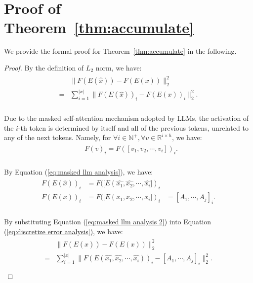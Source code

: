 \section{Proof of Theorem~\ref{thm:accumulate}}
\label{appendix:error_accumulate}
We provide the formal proof for Theorem~\ref{thm:accumulate} in the following. 
\begin{proof}
By the definition of $L_2$ norm, we have:\\
\begin{align}
\label{eq:discretize error analysis}
\begin{aligned}
    &  \| F(E(\hat{x}))-F(E(x)) \|_2^2 \\
    =& \sum_{i=1}^{|x|} \| F(E(\hat{x}))_i-F(E(x))_i \|_2^2.\\
\end{aligned}
\end{align}

Due to the masked self-attention mechanism adopted by LLMs, the activation of the $i$-th token is determined by itself and all of the previous tokens, unrelated to any of the next tokens. Namely, for $\forall i\in \mathbb{N}^+ ,\forall v \in \mathbb{R}^{i\times h}$, we have:\\
\begin{align}
\label{eq:masked llm analysis}
\begin{aligned}
    &  F(v)_i=  F([v_1,v_2,\cdots,v_i])_i .\\
\end{aligned}
\end{align}

By Equation (\ref{eq:masked llm analysis}), we have:\\
\begin{align}
\label{eq:masked llm analysis 2}
\begin{aligned}
      F(E(\hat{x}))_i &=  F([E(\hat{x_1},\hat{x_2},\cdots,\hat{x_i}])_i \\
      F(E(x))_i &= F([E(x_1,x_2,\cdots,x_i])_i&=[A_1,\cdots,A_j]_i. \\
\end{aligned}
\end{align}

By substituting Equation (\ref{eq:masked llm analysis 2}) into Equation (\ref{eq:discretize error analysis}), we have:\\
\begin{align}
\label{eq:discretize error analysis based on masked llm}
\begin{aligned}
    &  \| F(E(\hat{x}))-F(E(x)) \|_2^2 \\
    =& \sum_{i=1}^{|x|} \| F(E(\hat{x_1},\hat{x_2},\cdots,\hat{x_i}))_i-[A_1,\cdots,A_j]_i \|_2^2.\\
\end{aligned}
\end{align}


\end{proof}
